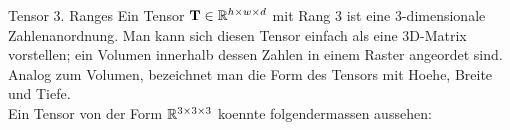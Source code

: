 \begin{defbox}{Tensor 3. Ranges}
  Ein Tensor $\mathbf{T} \in \mathbb{R}^{h \times w \times d}$ mit Rang 3 ist eine 3-dimensionale Zahlenanordnung. Man kann sich
  diesen Tensor einfach als eine 3D-Matrix vorstellen; ein Volumen innerhalb
  dessen Zahlen in einem Raster angeordet sind.
  Analog zum Volumen, bezeichnet man die Form des Tensors mit Hoehe, Breite und
  Tiefe. \\
  Ein Tensor von der Form $\mathbb{R}^{3 \times 3 \times 3}$ koennte folgendermassen
  aussehen:
  \para{}




\end{defbox}
\newcommand{\arrayfilling}[2]{
  \fill[#2!30, opacity=.5] ([shift={(1mm,1mm)}]#1.north west) coordinate(#1auxnw)--([shift={(1mm,1mm)}]#1.north east)coordinate(#1auxne) to[out=-75, in=75] ([shift={(1mm,-1mm)}]#1.south east)coordinate(#1auxse)--([shift={(1mm,-1mm)}]#1.south west)coordinate(#1auxsw) to[out=105, in=-105] cycle;
  \fill[#2!80!black, opacity=1] (#1auxne) to[out=-75, in=75] (#1auxse) to[out=78, in=-78] cycle;
  \fill[#2!80!black, opacity=1] (#1auxnw) to[out=-105, in=105] (#1auxsw) to[out=102, in=-102] cycle;
}

